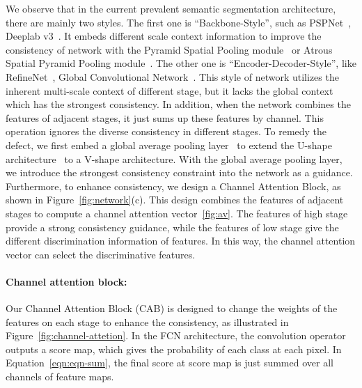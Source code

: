 \documentclass[10pt,twocolumn,letterpaper]{article}
\begin{document}
We observe that in the current prevalent semantic segmentation architecture, there are mainly two styles. The first one is ``Backbone-Style'', such as PSPNet~\cite{Zhao-CVPR-PSPNet-2017}, Deeplab v3~\cite{Chen-Arxiv-Deeplabv3-2017}. It embeds different scale context information to improve the consistency of network with the Pyramid Spatial Pooling module~\cite{He-ECCV-SPP-2014} or Atrous Spatial Pyramid Pooling module~\cite{Chen-Arxiv-Deeplabv2-2016}. The other one is ``Encoder-Decoder-Style'', like RefineNet~\cite{Lin-CVPR-Refinenet-2017}, Global Convolutional Network~\cite{Peng-CVPR-Largekernl-2017}. This style of network utilizes the inherent multi-scale context of different stage, but it lacks the global context which has the strongest consistency. In addition, when the network combines the features of adjacent stages, it just sums up these features by channel. This operation ignores the diverse consistency in different stages. To remedy the defect, we first embed a global average pooling layer~\cite{Liu-ICLR-ParseNet-2016} to extend the U-shape architecture~\cite{Long-CVPR-FCN-2015, Xie-ICCV-HEAD-2015} to a V-shape architecture. With the global average pooling layer, we introduce the strongest consistency constraint into the network as a guidance. Furthermore, to enhance consistency, we design a Channel Attention Block, as shown in Figure~\ref{fig:network}(c). This design combines the features of adjacent stages to compute a channel attention vector~\ref{fig:av}. The features of high stage provide a strong consistency guidance, while the features of low stage give the different discrimination information of features. In this way, the channel attention vector can select the discriminative features. 

\vspace{-2ex}    
\paragraph{Channel attention block:} Our Channel Attention Block (CAB) is designed to change the weights of the features on each stage to enhance the consistency, as illustrated in Figure~\ref{fig:channel-attetion}. In the FCN architecture, the convolution operator outputs a score map, which gives the probability of each class at each pixel. In Equation~\ref{eqn:eqn-sum}, the final score at score map is just summed over all channels of feature maps.
\end{document}
